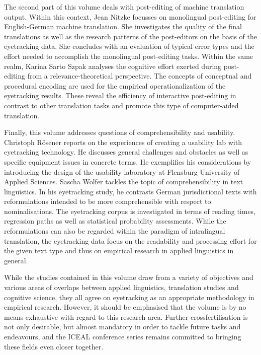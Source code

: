 \documentclass[output=paper]{langsci/langscibook}
\begin{document}
The second part of this volume deals with post-editing of machine translation output. Within this context, Jean Nitzke focusses on monolingual post-editing for English-German machine translation. She investigates the quality of the final translations as well as the research patterns of the post-editors on the basis of the eyetracking data. She concludes with an evaluation of typical error types and the effort needed to accomplish the monolingual post-editing tasks. Within the same realm, Karina Sarto Szpak analyses the cognitive effort exerted during post-editing from a relevance-theoretical perspective. The concepts of conceptual and procedural encoding are used for the empirical operationalization of the eyetracking results. These reveal the efficiency of interactive post-editing in contrast to other translation tasks and promote this type of computer-aided translation.

Finally, this volume addresses questions of comprehensibility and usability. Christoph Rösener reports on the experiences of creating a usability lab with eyetracking technology. He discusses general challenges and obstacles as well as specific equipment issues in concrete terms. He exemplifies his considerations by introducing the design of the usability laboratory at Flensburg University of Applied Sciences. Sascha Wolfer tackles the topic of comprehensibility in text linguistics. In his eyetracking study, he contrasts German jurisdictional texts with reformulations intended to be more comprehensible with respect to nominalisations. The eyetracking corpus is investigated in terms of reading times, regression paths as well as statistical probability assessments. While the reformulations can also be regarded within the paradigm of intralingual translation, the eyetracking data focus on the readability and processing effort for the given text type and thus on empirical research in applied linguistics in general.

While the studies contained in this volume draw from a variety of objectives and various areas of overlaps between applied linguistics, translation studies and cognitive science, they all agree on eyetracking as an appropriate methodology in empirical research. However, it should be emphasised that the volume is by no means exhaustive with regard to this research area. Further crossfertilisation is not only desirable, but almost mandatory in order to tackle future tasks and endeavours, and the ICEAL conference series remains committed to bringing these fields even closer together. 
\end{document}
